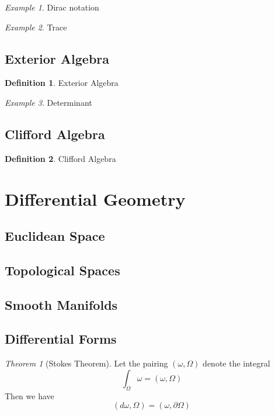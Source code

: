 \documentclass[12pt]{article}
\theoremstyle{definition}
\newtheorem{definition}{Definition}[section]
\theoremstyle{remark}
\theoremstyle{example}
\newtheorem{example}{Example}
\theoremstyle{theorem}
\newtheorem{theorem}{Theorem}
\theoremstyle{lemma}
\begin{document}
\begin{example}
	Dirac notation
\end{example}

\begin{example}
	Trace
\end{example}

\subsection{Exterior Algebra}

\begin{definition}
	Exterior Algebra
\end{definition}

\begin{example}
	Determinant
\end{example}

\subsection{Clifford Algebra}

\begin{definition}
	Clifford Algebra
\end{definition}

\section{Differential Geometry}

\subsection{Euclidean Space}

\subsection{Topological Spaces}

\subsection{Smooth Manifolds}

\subsection{Differential Forms}

\begin{theorem}[Stokes Theorem]
	Let the pairing $(\omega,\Omega)$ denote the integral
	\begin{equation}
		\int_\Omega\omega = (\omega,\Omega)
	\end{equation}
	Then we have
	\begin{equation}
		(d\omega,\Omega)=(\omega,\partial\Omega)
	\end{equation}
\end{theorem}
\end{document}

